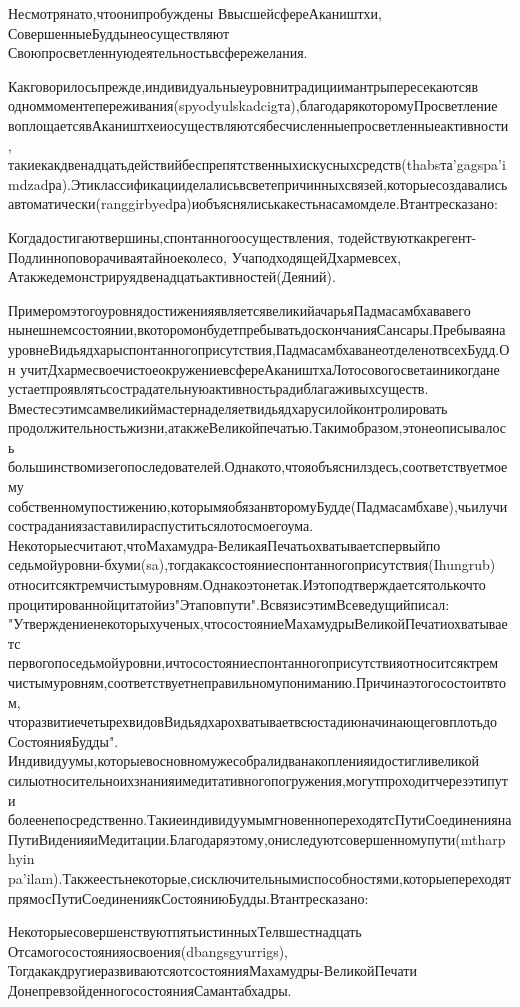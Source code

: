 Несмотрянато,чтоонипробуждены
ВвысшейсфереАкаништхи,
СовершенныеБуддынеосуществляют
Своюпросветленнуюдеятельностьвсфережелания.

Какговорилосьпрежде,индивидуальныеуровнитрадициимантрыпересекаютсяв
одноммоментепереживания(spyodyulskadcigта),благодарякоторомуПросветление
воплощаетсявАкаништхеиосуществляютсябесчисленныепросветленныеактивности,
такиекакдвенадцатьдействийбеспрепятственныхискусныхсредств(thabsта'gagspa'i
mdzadра).Этиклассификацииделалисьвсветепричинныхсвязей,которыесоздавались
автоматически(ranggirbyedра)иобъяснялиськакестьнасамомделе.Втантресказано:

Когдадостигаютвершины,спонтанногоосуществления,
тодействуюткакрегент-
Подлинноповорачиваятайноеколесо,
УчаподходящейДхармевсех,
Атакжедемонстрируядвенадцатьактивностей(Деяний).

ПримеромэтогоуровнядостиженияявляетсявеликийачарьяПадмасамбхававего
нынешнемсостоянии,вкоторомонбудетпребыватьдоскончанияСансары.Пребываяна
уровнеВидьядхарыспонтанногоприсутствия,ПадмасамбхаванеотделенотвсехБудд.Он
учитДхармесвоечистоеокружениевсфереАкаништхаЛотосовогосветаиникогдане
устаетпроявлятьсострадательнуюактивностьрадиблагаживыхсуществ.
Вместесэтимсамвеликиймастернаделяетвидьядхарусилойконтролировать
продолжительностьжизни,атакжеВеликойпечатью.Такимобразом,этонеописывалось
большинствомизегопоследователей.Однакото,чтояобъяснилздесь,соответствуетмоему
собственномупостижению,которымяобязанвторомуБудде(Падмасамбхаве),чьилучи
состраданиязаставилираспуститьсялотосмоегоума.
Некоторыесчитают,чтоМахамудра-ВеликаяПечатьохватываетспервыйпо
седьмойуровни-бхуми(sa),тогдакаксостояниеспонтанногоприсутствия(Ihungrub)
относитсяктремчистымуровням.Однакоэтонетак.Иэтоподтверждаетсятолькочто
процитированнойцитатойиз"Этаповпути".ВсвязисэтимВсеведущийписал:
"Утверждениенекоторыхученых,чтосостояниеМахамудрыВеликойПечатиохватываетс
первогопоседьмойуровни,ичтосостояниеспонтанногоприсутствияотноситсяктрем
чистымуровням,соответствуетнеправильномупониманию.Причинаэтогосостоитвтом,
чторазвитиечетырехвидовВидьядхарохватываетвсюстадиюначинающеговплотьдо
СостоянияБудды".
Индивидуумы,которыевосновномужесобралидванакопленияидостигливеликой
силыотносительноихзнанияимедитативногопогружения,могутпроходитчерезэтипути
болеенепосредственно.ТакиеиндивидуумымгновеннопереходятсПутиСоединенияна
ПутиВиденияиМедитации.Благодаряэтому,ониследуютсовершенномупути(mtharphyin
pa'ilam).Такжеестьнекоторые,сисключительнымиспособностями,которыепереходят
прямосПутиСоединениякСостояниюБудды.Втантресказано:

НекоторыесовершенствуютпятьистинныхТелвшестнадцать
Отсамогосостоянияосвоения(dbangsgyurrigs),
ТогдакакдругиеразвиваютсяотсостоянияМахамудры-ВеликойПечати
ДонепревзойденногосостоянияСамантабхадры.

